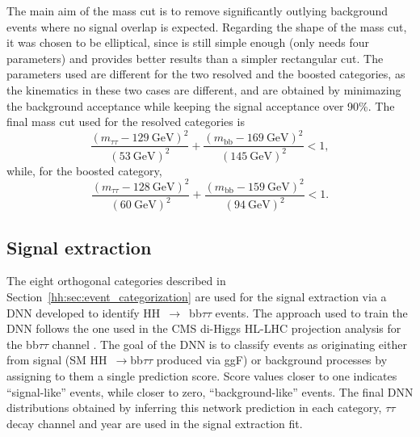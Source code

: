 \documentclass[../main.tex]{subfiles}
\begin{document}
The main aim of the mass cut is to remove significantly outlying background events where no signal overlap is expected. Regarding the shape of the mass cut, it was chosen to be elliptical, since is still simple enough (only needs four parameters) and provides better results than a simpler rectangular cut. The parameters used are different for the two resolved and the boosted categories, as the kinematics in these two cases are different, and are obtained by minimazing the background acceptance while keeping the signal acceptance over 90\%. The final mass cut used for the resolved categories is
\begin{equation}
\frac{\left(m_{\tau\tau} - 129 ~\text{GeV}\right)^2}{(53~\text{GeV})^2} + \frac{\left(m_{\text{bb}} - 169 ~\text{GeV}\right)^2}{(145~\text{GeV})^2} < 1,
\end{equation}
while, for the boosted category,
\begin{equation}
\frac{\left(m_{\tau\tau} - 128 ~\text{GeV}\right)^2}{(60~\text{GeV})^2} + \frac{\left(m_{\text{bb}} - 159 ~\text{GeV}\right)^2}{(94~\text{GeV})^2} < 1.
\end{equation}

%


\subsection{Signal extraction}
\label{hh:subsec:signal_extraction}

The eight orthogonal categories described in Section~\ref{hh:sec:event_categorization} are used for the signal extraction via a DNN developed to identify HH~$\to$~bb$\tau\tau$ events. The approach used to train the DNN \cite{hh:analysis:gilesdnn} follows the one used in the CMS di-Higgs HL-LHC projection analysis for the bb$\tau\tau$ channel \cite{hh:analysis:hh_hllhc}. The goal of the DNN is to classify events as originating either from signal (SM HH~$\to$bb$\tau\tau$ produced via ggF) or background processes by assigning to them a single prediction score. Score values closer to one indicates ``signal-like'' events, while  closer to zero, ``background-like'' events. The final DNN distributions obtained by inferring this network prediction in each category, $\tau\tau$ decay channel and year are used in the signal extraction fit.
\end{document}
